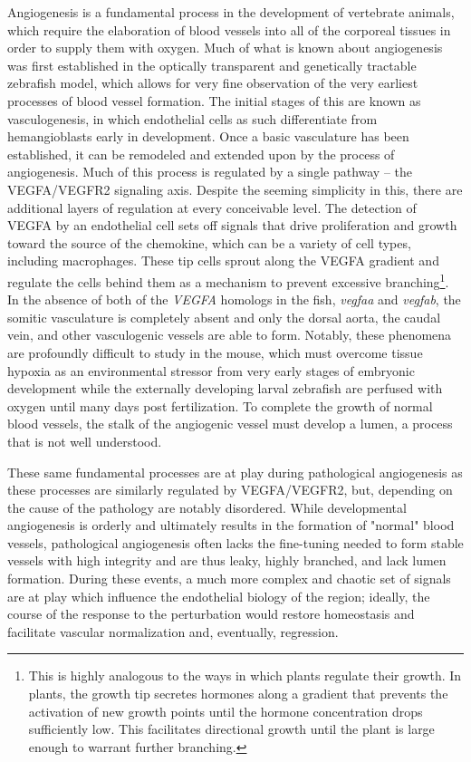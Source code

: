 Angiogenesis is a fundamental process in the development of vertebrate animals, which require the elaboration of blood vessels into all of the corporeal tissues in order to supply them with oxygen. Much of what is known about angiogenesis was first established in the optically transparent and genetically tractable zebrafish model, which allows for very fine observation of the very earliest processes of blood vessel formation. The initial stages of this are known as vasculogenesis, in which endothelial cells as such differentiate from hemangioblasts early in development. Once a basic vasculature has been established, it can be remodeled and extended upon by the process of angiogenesis. Much of this process is regulated by a single pathway -- the VEGFA/VEGFR2 signaling axis. Despite the seeming simplicity in this, there are additional layers of regulation at every conceivable level. The detection of VEGFA by an endothelial cell sets off signals that drive proliferation and growth toward the source of the chemokine, which can be a variety of cell types, including macrophages. These tip cells sprout along the VEGFA gradient and regulate the cells behind them as a mechanism to prevent excessive branching\footnote{This is highly analogous to the ways in which plants regulate their growth. In plants, the growth tip secretes hormones along a gradient that prevents the activation of new growth points until the hormone concentration drops sufficiently low. This facilitates directional growth until the plant is large enough to warrant further branching.}. In the absence of both of the \textit{VEGFA} homologs in the fish, \textit{vegfaa} and \textit{vegfab}, the somitic vasculature is completely absent and only the dorsal aorta, the caudal vein, and other vasculogenic vessels are able to form. Notably, these phenomena are profoundly difficult to study in the mouse, which must overcome tissue hypoxia as an environmental stressor from very early stages of embryonic development while the externally developing larval zebrafish are perfused with oxygen until many days post fertilization. To complete the growth of normal blood vessels, the stalk of the angiogenic vessel must develop a lumen, a process that is not well understood.

These same fundamental processes are at play during pathological angiogenesis as these processes are similarly regulated by VEGFA/VEGFR2, but, depending on the cause of the pathology are notably disordered. While developmental angiogenesis is orderly and ultimately results in the formation of "normal" blood vessels, pathological angiogenesis often lacks the fine-tuning needed to form stable vessels with high integrity and are thus leaky, highly branched, and lack lumen formation. During these events, a much more complex and chaotic set of signals are at play which influence the endothelial biology of the region; ideally, the course of the response to the perturbation would restore homeostasis and facilitate vascular normalization and, eventually, regression.

